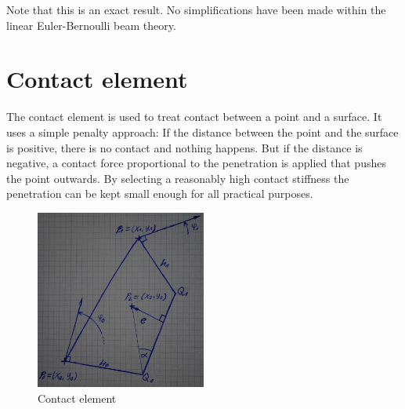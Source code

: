 Note that this is an exact result. No simplifications have been made within the linear Euler-Bernoulli beam theory.





































\newpage
\section{Contact element}

The contact element is used to treat contact between a point and a surface. It uses a simple penalty approach: If the distance between the point and the surface is positive, there is no contact and nothing happens. But if the distance is negative, a contact force proportional to the penetration is applied that pushes the point outwards. By selecting a reasonably high contact stiffness the penetration can be kept small enough for all practical purposes.

\begin{figure}[h]
\centering
\includegraphics[width=0.5\textwidth]{figures/elements/contact_element_0}
\caption{Contact element}
\end{figure}

